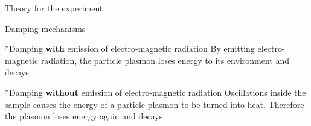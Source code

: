 \documentclass[pdftex, a4paper,11pt, twoside, UKenglish]{report}
\begin{document}
\begin{chapter}{Theory for the experiment}
\begin{section}{Damping mechanisms}
      \begin{subsection}*{Damping \textbf{with} emission of electro-magnetic
        radiation}
        By emitting electro-magnetic radiation, the particle plasmon loses
        energy to its environment and decays.
      \end{subsection}
      
      \begin{subsection}*{Damping \textbf{without} emission of electro-magnetic
        radiation}
        Oscillations inside the sample causes the energy of a particle plasmon
        to be turned into heat. Therefore the plasmon loses energy again and
        decays.
      \end{subsection}
      
    \end{section}
    
    
    

\end{chapter}
\end{document}
